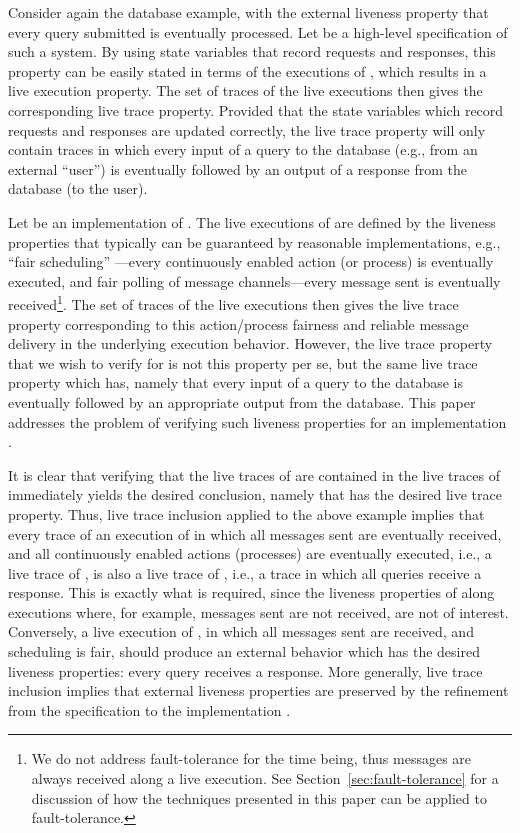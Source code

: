 \documentclass[11pt]{article}
\begin{document}
Consider again the database example, with the external liveness property that
every query submitted is eventually processed.  Let  be a
high-level specification of such a system.  By using state variables
that record requests and responses, this property can be easily stated
in terms of the executions of , which results in a live execution
property.  The set of traces of the live executions then gives the
corresponding live trace property. Provided that the state variables
which record requests and responses are updated correctly, the live
trace property will only contain traces in which every input of a
query to the database (e.g., from an external ``user'') is eventually
followed by an output of a response from the database (to the user).

Let  be an implementation of . The live executions of  are
defined by the liveness properties that typically can be guaranteed by
reasonable implementations, e.g., ``fair scheduling''
\cite{Fr86}---every continuously enabled action (or process) is
eventually executed, and fair polling of message channels---every
message sent is eventually received\footnote{We do not address
fault-tolerance for the time being, thus messages are always received
along a live execution. See Section~\ref{sec:fault-tolerance} for a
discussion of how the techniques presented in this paper can be
applied to fault-tolerance.}.
The set of traces of the live executions then gives the 
live trace property corresponding to this action/process fairness and
reliable message delivery in the underlying execution behavior.
However, the live trace property that we wish to verify for  is not
this property per se, but the same live trace property which  has, namely that
every input of a query to
the database is eventually followed by an appropriate output from the database.
This paper addresses the problem of verifying such liveness properties
for an implementation  .

It is clear that verifying that the live traces of  are contained
in the live traces of  immediately yields the desired conclusion,
namely that  has the desired live trace property.
Thus, live trace inclusion applied to the above example implies that
every trace of an execution of  in which all messages sent are
eventually received, and all continuously enabled actions (processes)
are eventually executed, i.e., a live trace of , is also a live
trace of , i.e., a trace in which all queries receive a response. This
is exactly what is required, since the liveness properties of 
along executions where, for example, messages sent are not received,
are not of interest. Conversely, a live execution of , in which all
messages sent are received, and scheduling is fair, should produce an
external behavior which has the desired liveness properties:
every query receives a response.
More generally, live trace inclusion 
implies that external liveness properties are
preserved by the refinement from the specification  to the implementation
.
\end{document}
